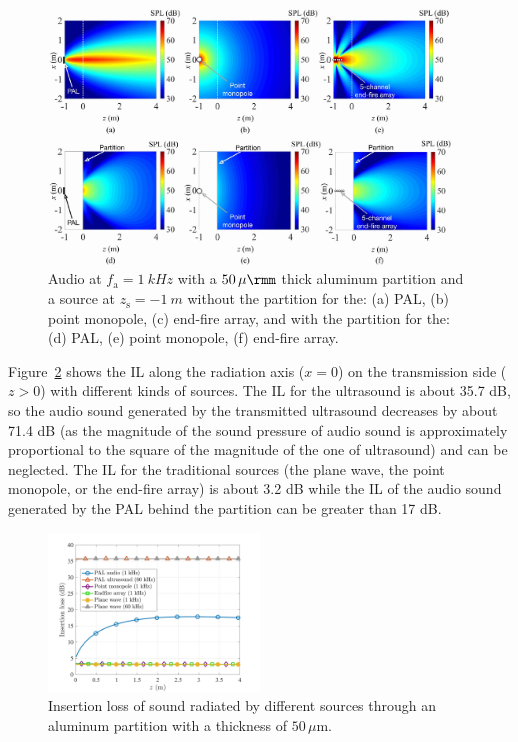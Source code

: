 \begin{figure}[!htb]
    \centering
    \includegraphics[width = 0.95\textwidth]{Figures/pending/thick50_zPal1m_190919C_200605.jpg}
    \caption{Audio  at $f_{\mathrm{a}} = \SI{1}{kHz}$ with a ${50}\,\mu{\rmm}$ thick aluminum partition and a source at $z_{\mathrm{s}} = \SI{-1}{m}$ without the partition for the: (a) PAL, (b) point monopole, (c) end-fire array, and with the partition for the: (d) PAL, (e) point monopole, (f) end-fire array. 
    }
    \label{fig:partition_sim_50mum}
\end{figure}

Figure~\ref{fig:partition_sim_50mum_aluminum} shows the IL along the radiation axis ($x = 0$) on the transmission side ($z > 0$) with different kinds of sources. 
The IL for the ultrasound is about 35.7 dB, so the audio sound generated by the transmitted ultrasound decreases by about 71.4 dB (as the magnitude of the sound pressure of audio sound is approximately proportional to the square of the magnitude of the one of ultrasound) and can be neglected. 
The IL for the traditional sources (the plane wave, the point monopole, or the end-fire array) is about 3.2 dB while the IL of the audio sound generated by the PAL behind the partition can be greater than 17 dB. 

\begin{figure}[!htb]
    \centering
    \includegraphics[width = 0.5\textwidth]{Figures/pending/CompareAxisIL_fluid_thick50mum_190929B.jpg}
    \caption{Insertion loss of sound radiated by different sources through an aluminum partition with a thickness of $50\,\mu{\mathrm{m}}$.}
    \label{fig:partition_sim_50mum_aluminum}
\end{figure}

